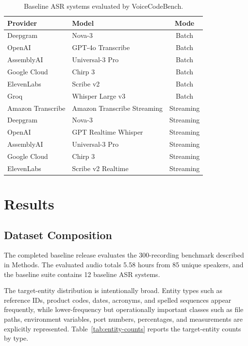 \documentclass[10pt,twocolumn]{article}
\begin{document}
\begin{table}[t]\centering\footnotesize\begin{tabular}{llc}
		\toprule
		Provider          & Model                       & Mode
		\\
		\midrule
		Deepgram          & Nova-3                      & Batch
		\\
		OpenAI            & GPT-4o Transcribe           & Batch
		\\
		AssemblyAI        & Universal-3 Pro             & Batch
		\\
		Google Cloud      & Chirp 3                     & Batch
		\\
		ElevenLabs        & Scribe v2                   & Batch
		\\
		Groq              & Whisper Large v3            & Batch
		\\
		Amazon Transcribe & Amazon Transcribe Streaming & Streaming
		\\
		Deepgram          & Nova-3                      & Streaming
		\\
		OpenAI            & GPT Realtime Whisper        & Streaming
		\\
		AssemblyAI        & Universal-3 Pro             & Streaming
		\\
		Google Cloud      & Chirp 3                     & Streaming
		\\
		ElevenLabs        & Scribe v2 Realtime          & Streaming
		\\
		\bottomrule
	\end{tabular}
	\caption{Baseline ASR systems evaluated by VoiceCodeBench.}\label{tab:baseline-systems}
\end{table}

\section{Results}\label{results}

\subsection{Dataset Composition}\label{dataset-composition}

The completed baseline release evaluates the 300-recording benchmark
described in Methods. The evaluated audio totals 5.58 hours from 85
unique speakers, and the baseline suite contains 12 baseline ASR systems.

The target-entity distribution is intentionally broad. Entity types such
as reference IDs, product codes, dates, acronyms, and spelled sequences
appear frequently, while lower-frequency but operationally important
classes such as file paths, environment variables, port numbers,
percentages, and measurements are explicitly represented.
Table~\ref{tab:entity-counts} reports the target-entity counts by type.
\end{document}
